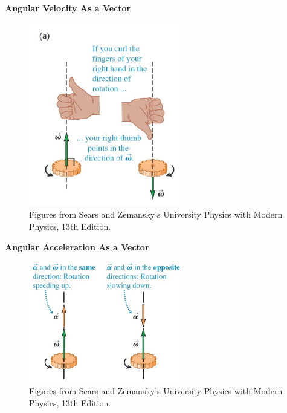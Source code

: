 \documentclass[]{beamer}
\begin{document}

\begin{frame}
     
     \textbf{Angular Velocity As a Vector}   
     \vspace{3mm}
    

     \begin{figure}[h!]  
        \includegraphics[width=0.6\textwidth]{images/13.jpg}
        \caption{ {\tiny Figures from Sears and Zemansky's University Physics 
        with Modern Physics, 13th Edition.} }
      \end{figure}
   
   
        \end{frame}
   

\begin{frame}
     
    \textbf{Angular Acceleration As a Vector}   
    \vspace{3mm}
   

    \begin{figure}[h!]  
       \includegraphics[width=0.6\textwidth]{images/14.jpg}
       \caption{ {\tiny Figures from Sears and Zemansky's University Physics 
       with Modern Physics, 13th Edition.} }
     \end{figure}
  
  
       \end{frame}
  
\end{document}
